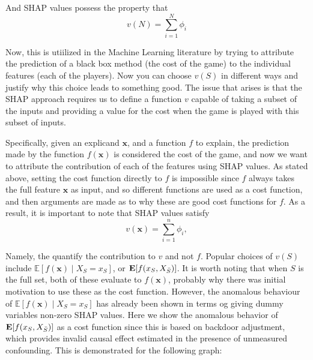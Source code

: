 \documentclass{article}
\begin{document}
And SHAP values possess the property that 
\[
v(N) = \sum_{i = 1}^N \phi_i
\]

Now, this is utiilized in the Machine Learning literature by trying to attribute the prediction of a black box method (the cost of the game) to the individual features (each of the players). Now you can choose $v(S)$ in different ways and justify why this choice leads to something good. The issue that arises is that the SHAP approach requires us to define a function $v$ capable of taking a subset of the inputs and providing a value for the cost when the game is played with this subset of inputs.

Specifically, given an explicand $\mathbf{x}$, and a function $f$ to explain, the prediction made by the function $f(\mathbf{x})$ is considered the cost of the game, and now we want to attribute the contribution of each of the features using SHAP values. As stated above, setting the cost function directly to $f$ is impossible since $f$ always takes the full feature $\mathbf{x}$ as input, and so different functions are used as a cost function, and then arguments are made as to why these are good cost functions for $f$. As a result, it is important to note that SHAP values satisfy 
\[
v(\mathbf{x}) = \sum_{i = 1}^n \phi_i,
\]

Namely, the quantify the contribution to $v$ and not $f$. Popular choices of $v(S)$ include $\mathbb{E}[f(\mathbf{x}) \mid X_S = x_S ]$, or $\mathbf{E}[f(x_S, X_{\Bar{S}})]$. It is worth noting that when $S$ is the full set, both of these evaluate to $f(\mathbf{x})$, probably why there was initial motivation to use these as the cost function. However, the anomalous behaviour of  $\mathbb{E}[f(\mathbf{x}) \mid X_S = x_S ]$ has already been shown in terms og giving dummy variables non-zero SHAP values. Here we show the anomalous behavior of $\mathbf{E}[f(x_S, X_{\Bar{S}})]$ as a cost function since this is based on backdoor adjustment, which provides invalid causal effect estimated in the presence of unmeasured confounding. This is demonstrated for the following graph:
\end{document}

